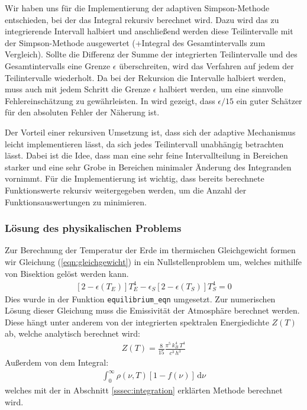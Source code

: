 \documentclass[10pt,a4paper]{article}
\begin{document}
Wir haben uns für die Implementierung der adaptiven Simpson-Methode entschieden, bei der das Integral rekursiv berechnet wird. Dazu wird das zu integrierende Intervall halbiert und anschließend werden diese Teilintervalle mit der Simpson-Methode ausgewertet (+Integral des Gesamtintervalls zum Vergleich). Sollte die Differenz der Summe der integrierten Teilintervalle und des Gesamtintervalls eine Grenze $\epsilon$ überschreiten, wird das Verfahren auf jedem der Teilintervalle wiederholt. Da bei der Rekursion die Intervalle halbiert werden, muss auch mit jedem Schritt die Grenze $\epsilon$ halbiert werden, um eine sinnvolle Fehlereinschätzung zu gewährleisten. In \cite{lyness} wird gezeigt, dass $\epsilon / 15$ ein guter Schätzer für den absoluten Fehler der Näherung ist.

Der Vorteil einer rekursiven Umsetzung ist, dass sich der adaptive Mechanismus leicht implementieren lässt, da sich jedes Teilintervall unabhängig betrachten lässt. Dabei ist die Idee, dass man eine sehr feine Intervallteilung in Bereichen starker und eine sehr Grobe in Bereichen minimaler Änderung des Integranden vornimmt. Für die Implementierung ist wichtig, dass bereits berechnete Funktionswerte rekursiv weitergegeben werden, um die Anzahl der Funktionsauswertungen zu minimieren.


\subsubsection{Lösung des physikalischen Problems}

Zur Berechnung der Temperatur der Erde im thermischen Gleichgewicht formen wir Gleichung (\ref{eqn:gleichgewicht}) in ein Nullstellenproblem um, welches mithilfe von Bisektion gelöst werden kann.
\begin{align}
	\left[2-\epsilon(T_E)\right]T_E^4 - \epsilon_S\left[2-\epsilon(T_S)\right]T_S^4 = 0
	\label{eq:nullstellenproblem}
\end{align}
Dies wurde in der Funktion \texttt{equilibrium\_eqn} umgesetzt. Zur numerischen Lösung dieser Gleichung muss die Emissivität der Atmosphäre berechnet werden. Diese hängt unter anderem von der integrierten spektralen Energiedichte $Z(T)$ ab, welche analytisch berechnet wird:
\begin{align}
	Z(T) = \frac{8}{15} \frac{\pi^5 \, k_B^4 \, T^4}{c^3 \, h^3}
\end{align}
Außerdem von dem Integral:
\begin{align}
	\int_0^\infty \rho(\nu,T)[1 - f(\nu)] \, \mathrm{d}\nu
\end{align}
welches mit der in Abschnitt \ref{sssec:integration} erklärten Methode berechnet wird.
\end{document}

